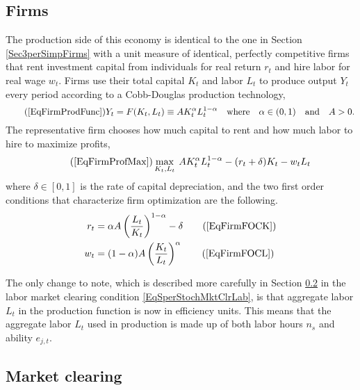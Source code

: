 \documentclass[letterpaper,12pt]{article}
\theoremstyle{definition}
\numberwithin{equation}{section}
\numberwithin{exercise}{section}
\begin{document}
\begin{spacing}{1.5}
   \subsection{Firms}\label{SecSperStochFirms}

      The production side of this economy is identical to the one in Section \ref{Sec3perSimpFirms} with a unit measure of identical, perfectly competitive firms that rent investment capital from individuals for real return $r_t$ and hire labor for real wage $w_t$. Firms use their total capital $K_t$ and labor $L_t$ to produce output $Y_t$ every period according to a Cobb-Douglas production technology,
      \begin{equation}\tag{\ref{EqFirmProdFunc}}
         Y_t = F(K_t,L_t) \equiv AK_t^\alpha L_t^{1-\alpha}\quad\text{where}\quad \alpha\in(0,1) \quad\text{and}\quad A>0.
      \end{equation}
      The representative firm chooses how much capital to rent and how much labor to hire to maximize profits,
      \begin{equation}\tag{\ref{EqFirmProfMax}}
         \max_{K_t,L_t}\: AK_t^\alpha L_t^{1-\alpha} - (r_t + \delta)K_t - w_t L_t
      \end{equation}
      where $\delta\in[0,1]$ is the rate of capital depreciation, and the two first order conditions that characterize firm optimization are the following.
      \begin{align}
         r_t &= \alpha A\left(\frac{L_t}{K_t}\right)^{1-\alpha} - \delta \tag{\ref{EqFirmFOCK}} \\
         w_t &= (1-\alpha)A\left(\frac{K_t}{L_t}\right)^\alpha \tag{\ref{EqFirmFOCL}}
      \end{align}

      The only change to note, which is described more carefully in Section \ref{SecSperStochMC} in the labor market clearing condition \eqref{EqSperStochMktClrLab}, is that aggregate labor $L_t$ in the production function is now in efficiency units. This means that the aggregate labor $L_t$ used in production is made up of both labor hours $n_{s}$ and ability $e_{j,t}$.


   \subsection{Market clearing}\label{SecSperStochMC}


\end{spacing}
\end{document}
